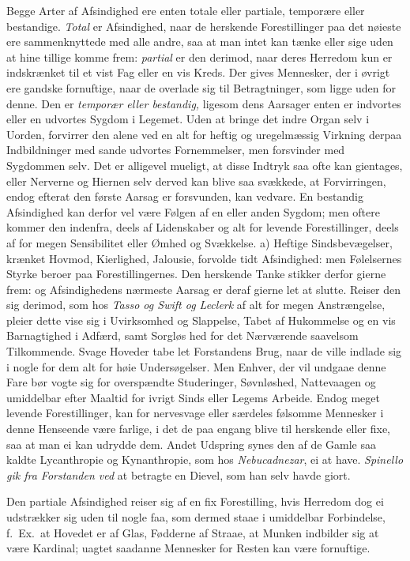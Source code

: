 \documentclass[12pt,a4paper]{article}
\newcommand{\opage}[1]{\marginnote{\footnotesize\textit{[#1]}}}
\begin{document}
Begge Arter af Afsindighed ere enten totale eller partiale, temporære eller bestandige.
\emph{Total} er Afsindighed, naar de herskende Forestillinger paa det nøieste ere
sammenknyttede med alle andre, saa at man intet kan tænke eller sige uden at hine tillige
komme frem:
\opage{139} \emph{partial} er den derimod, naar deres Herredom kun er indskrænket til et vist Fag
eller en vis Kreds. Der gives Mennesker, der i øvrigt ere gandske fornuftige, naar de
overlade sig til Betragtninger, som ligge uden for denne. Den er \emph{temporær eller
bestandig,} ligesom dens Aarsager enten er indvortes eller en udvortes Sygdom i Legemet.
Uden at bringe det indre Organ selv i Uorden, forvirrer den alene ved en alt for heftig
og uregelmæssig Virkning derpaa Indbildninger med sande udvortes Fornemmelser, men
forsvinder med Sygdommen selv. Det er alligevel mueligt, at disse Indtryk saa ofte kan
gientages, eller Nerverne og Hiernen selv derved kan blive saa svækkede, at Forvirringen,
endog efterat den første Aarsag er forsvunden, kan vedvare. En bestandig Afsindighed kan
derfor vel være Følgen af en eller anden Sygdom; men oftere kommer den indenfra, deels af
Lidenskaber og alt for levende Forestillinger, deels af for megen Sensibilitet eller
Ømhed og Svækkelse. a) Heftige Sindsbevægelser, krænket Hovmod, Kierlighed, Jalousie,
forvolde tidt Afsindighed: men Følelsernes Styrke beroer paa Forestillingernes. Den
herskende Tanke stikker derfor gierne frem: og Afsindighedens nærmeste Aarsag er deraf
gierne let at slutte. Reiser den sig derimod, som hos \emph{Tasso og Swift og Leclerk} af
alt for megen Anstrængelse, pleier dette vise sig i Uvirksomhed og Slappelse, Tabet af
Hukommelse og en vis Barnagtighed i Adfærd, samt Sorgløs%
\opage{140}hed for det Nærværende saavelsom Tilkommende. Svage Hoveder tabe let Forstandens Brug,
naar de ville indlade sig i nogle for dem alt for høie Undersøgelser. Men Enhver, der vil
undgaae denne Fare bør vogte sig for overspændte Studeringer, Søvnløshed, Nattevaagen og
umiddelbar efter Maaltid for ivrigt Sinds eller Legems Arbeide. Endog meget levende
Forestillinger, kan for nervesvage eller særdeles følsomme Mennesker i denne Henseende
være farlige, i det de paa engang blive til herskende eller fixe, saa at man ei kan
udrydde dem. Andet Udspring synes den af de Gamle saa kaldte Lycanthropie og
Kynanthropie, som hos \emph{Nebucadnezar}, ei at have. \emph{Spinello gik fra Forstanden
ved} at betragte en Dievel, som han selv havde giort.

Den partiale Afsindighed reiser sig af en fix Forestilling, hvis Herredom dog ei
udstrækker sig uden til nogle faa, som dermed staae i umiddelbar Forbindelse, f.~Ex.\ at
Hovedet er af Glas, Fødderne af Straae, at Munken indbilder sig at være Kardinal; uagtet
saadanne Mennesker for Resten kan være fornuftige.
\end{document}
